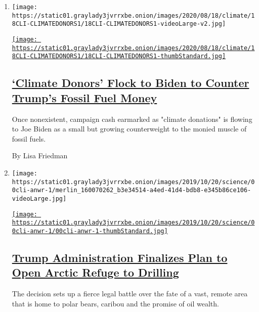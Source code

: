 \begin{enumerate}
\def\labelenumi{\arabic{enumi}.}
\item
  \texttt{[image: https://static01.graylady3jvrrxbe.onion/images/2020/08/18/climate/18CLI-CLIMATEDONORS1/18CLI-CLIMATEDONORS1-videoLarge-v2.jpg]}

  \href{/2020/08/18/climate/climate-change-biden.html}{\texttt{[image: https://static01.graylady3jvrrxbe.onion/images/2020/08/18/climate/18CLI-CLIMATEDONORS1/18CLI-CLIMATEDONORS1-thumbStandard.jpg]}}

  \hypertarget{climate-donors-flock-to-biden-to-counter-trumps-fossil-fuel-money}{%
  \subsection{\texorpdfstring{\href{/2020/08/18/climate/climate-change-biden.html}{`Climate
  Donors' Flock to Biden to Counter Trump's Fossil Fuel
  Money}}{`Climate Donors' Flock to Biden to Counter Trump's Fossil Fuel Money}}\label{climate-donors-flock-to-biden-to-counter-trumps-fossil-fuel-money}}

  Once nonexistent, campaign cash earmarked as "climate donations" is
  flowing to Joe Biden as a small but growing counterweight to the
  monied muscle of fossil fuels.

  By Lisa Friedman
\item
  \texttt{[image: https://static01.graylady3jvrrxbe.onion/images/2019/10/20/science/00cli-anwr-1/merlin\_160070262\_b3e34514-a4ed-41d4-bdb8-e345b86ce106-videoLarge.jpg]}

  \href{/2020/08/17/climate/alaska-oil-drilling-anwr.html}{\texttt{[image: https://static01.graylady3jvrrxbe.onion/images/2019/10/20/science/00cli-anwr-1/00cli-anwr-1-thumbStandard.jpg]}}

  \hypertarget{trump-administration-finalizes-plan-to-open-arctic-refuge-to-drilling}{%
  \subsection{\texorpdfstring{\href{/2020/08/17/climate/alaska-oil-drilling-anwr.html}{Trump
  Administration Finalizes Plan to Open Arctic Refuge to
  Drilling}}{Trump Administration Finalizes Plan to Open Arctic Refuge to Drilling}}\label{trump-administration-finalizes-plan-to-open-arctic-refuge-to-drilling}}

  The decision sets up a fierce legal battle over the fate of a vast,
  remote area that is home to polar bears, caribou and the promise of
  oil wealth.


\end{enumerate}
